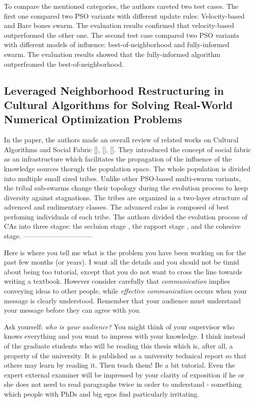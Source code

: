To compare the mentioned categories, the authors careted two test cases. The first one compared two PSO variants with different update rules: Velocity-based and Bare bones swarm. The evaluation results confirmed that velocity-based outperformed the other one. The second test case compared two PSO variants with different models of influence: best-of-neighborhood and fully-informed swarm. The evaluation results showed that the fully-informed algorithm outperfromed the best-of-neighborhood.
\subsection{Leveraged Neighborhood Restructuring in Cultural Algorithms for Solving Real-World Numerical Optimization Problems}
In the paper, the authors made an overall review of related works on Cultural Algorithms and Social Fabric [], [], []. They introduced the concept of social fabric as an infrastructure which facilitates the propagation of the influence of the knowledge sources thorugh the population space. The whole population is divided into multiple small sized tribes. Unlike other PSO-based multi-swarm variants, the tribal sub-swarms change their topology during the evolution process to keep diversity against stagnations.\newline
The tribes are organized in a two-layer structure of advenced and rudimentary classes. The advanced calss is composed of best perfoming individuals of each tribe. The authors divided the evolution process of CAs into three stages: the secluion stage , the rapport stage , and the cohesive stage. 
\newline------------------------------\newline

\newline

\newline

Here is where you tell me what is the problem you have been working on for the past few months (or years). I want all the details and you should not be timid about being too tutorial, except that you do not want to cross the line towards writing a textbook. However consider carefully that \textit{communication} implies conveying ideas to other people, while \textit{effective communication} occurs when your message is clearly understood. Remember that your audience must understand your message before they can agree with you.

Ask yourself:
\textit{who is your audience?} You might think of your supervisor who knows everything and you want to impress with your knowledge. I think instead of the graduate students who will be reading this thesis which is, after all, a property of the university. It is published as a university technical report so that others may learn by reading it. Then teach them! Be a bit tutorial. Even the expert external examiner will be impressed by your clarity of exposition if he or she does not need to read paragraphs twice in order to understand - something which people with PhDs and big egos find particularly irritating.

